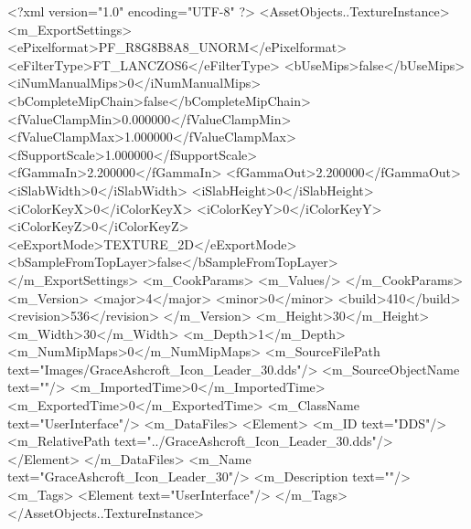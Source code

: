 <?xml version="1.0" encoding="UTF-8" ?>
<AssetObjects..TextureInstance>
	<m_ExportSettings>
		<ePixelformat>PF_R8G8B8A8_UNORM</ePixelformat>
		<eFilterType>FT_LANCZOS6</eFilterType>
		<bUseMips>false</bUseMips>
		<iNumManualMips>0</iNumManualMips>
		<bCompleteMipChain>false</bCompleteMipChain>
		<fValueClampMin>0.000000</fValueClampMin>
		<fValueClampMax>1.000000</fValueClampMax>
		<fSupportScale>1.000000</fSupportScale>
		<fGammaIn>2.200000</fGammaIn>
		<fGammaOut>2.200000</fGammaOut>
		<iSlabWidth>0</iSlabWidth>
		<iSlabHeight>0</iSlabHeight>
		<iColorKeyX>0</iColorKeyX>
		<iColorKeyY>0</iColorKeyY>
		<iColorKeyZ>0</iColorKeyZ>
		<eExportMode>TEXTURE_2D</eExportMode>
		<bSampleFromTopLayer>false</bSampleFromTopLayer>
	</m_ExportSettings>
	<m_CookParams>
		<m_Values/>
	</m_CookParams>
	<m_Version>
		<major>4</major>
		<minor>0</minor>
		<build>410</build>
		<revision>536</revision>
	</m_Version>
	<m_Height>30</m_Height>
	<m_Width>30</m_Width>
	<m_Depth>1</m_Depth>
	<m_NumMipMaps>0</m_NumMipMaps>
	<m_SourceFilePath text="Images/GraceAshcroft_Icon_Leader_30.dds"/>
	<m_SourceObjectName text=""/>
	<m_ImportedTime>0</m_ImportedTime>
	<m_ExportedTime>0</m_ExportedTime>
	<m_ClassName text="UserInterface"/>
	<m_DataFiles>
		<Element>
			<m_ID text="DDS"/>
			<m_RelativePath text="../GraceAshcroft_Icon_Leader_30.dds"/>
		</Element>
	</m_DataFiles>
	<m_Name text="GraceAshcroft_Icon_Leader_30"/>
	<m_Description text=""/>
	<m_Tags>
		<Element text="UserInterface"/>
	</m_Tags>
</AssetObjects..TextureInstance>
